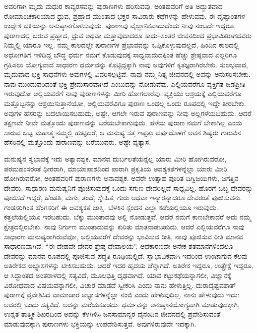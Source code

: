 ಅವರಿಗಾಗಿ ಮೃದು ಮಧುರ ಕಾವ್ಯರಸವನ್ನು ಪುರಾಣಗಳು ಹರಿಸುವವು. ಅಂತಹವರಿಗೆ ಅತಿ ಅದ್ಭುತವಾದ ರೋಮಾಂಚಕಾರಿಯಾದ ಧ್ರುವ, ಪ್ರಹ್ಲಾದ ಮುಂತಾದ ಭಕ್ತರ ಸಾವಿರಾರು ಕಥೆಗಳನ್ನು ಹೇಳುವವು. ಈ ದೃಷ್ಟಾಂತಗಳ ಉದ್ದೇಶ ಭಕ್ತಿಯನ್ನು ಅನುಷ್ಠಾನಗೊಳಿಸುವುದು. ಪುರಾಣವು ವೈಜ್ಞಾನಿಕವಾದುದೆಂದು ನೀವು ನಂಬದೇ ಇದ್ದರೂ, ಪುರಾಣದಲ್ಲಿ ಬರುವ ಪ್ರಹ್ಲಾದ, ಧ್ರುವ ಅಥವಾ ಮತ್ತಾವುದಾದರೂ ಸಾಧು–ಸಂತರ ಜೀವನದಿಂದ ಪ್ರಭಾವಿತರಾಗದವರು ನಿಮ್ಮಲ್ಲಿ ಯಾರೂ ಇಲ್ಲ. ನಮ್ಮ ಕಾಲದಲ್ಲೇ ಪುರಾಣಗಳ ಪ್ರಭಾವವನ್ನು ಒಪ್ಪಿಕೊಳ್ಳುವುದಲ್ಲದೆ, ಹಿಂದಿನ ಕಾಲದಲ್ಲಿ ಅಧೋಗತಿಗೆ ಇಳಿದಿದ್ದ ಬೌದ್ಧ ಧರ್ಮ ನಮಗೆ ಕೊಡುವುದಕ್ಕೆ ಸಾಧ್ಯವಾದುದಕ್ಕಿಂತ ಹೆಚ್ಚು ಶ್ರೇಷ್ಠವಾದ ಎಲ್ಲರಿಗೂ ಗ್ರಹಿಸಲು ಯೋಗ್ಯವಾದ ಸಾಧಾರಣ ಧರ್ಮವನ್ನು ಕೊಟ್ಟಿದ್ದಕ್ಕಾಗಿ ನಾವು ಅವುಗಳಿಗೆ ಕೃತಜ್ಞರಾಗಿರಬೇಕು. ಸುಲಭವಾದ, ಮೃದುವಾದ ಭಕ್ತಿ ಸಾಧನೆಗಳು ಅವುಗಳಲ್ಲಿ ವಿವರಿಸಲ್ಪಟ್ಟಿವೆ. ನಾವು ನಮ್ಮ ನಿತ್ಯ ಜೀವನದಲ್ಲಿ ಅವನ್ನು ಅನುಸರಿಸಬೇಕು. ನಾವು ಮುಂದುವರಿದಂತೆ ಭಕ್ತಿ ಪ್ರೇಮಸಾರವಾಗಿದೆ ಎಂಬುದನ್ನು ನೋಡುವೆವು. ಎಲ್ಲಿಯವರೆಗೂ ವ್ಯಕ್ತಿಗತ ಜಡಪ್ರೀತಿ ಇರುವುದೋ ಅಲ್ಲಿಯವರೆಗೆ ನಾವು ಪುರಾಣಗಳನ್ನು ಮೀರಿ ಹೋಗಲಾರೆವು. ವ್ಯಕ್ತಿಯು ಆಶ್ರಯಕ್ಕೆ ಎಲ್ಲಿಯವರೆಗೂ ಮತ್ತೊಬ್ಬನನ್ನು ಆಶ್ರಯಿಸುತ್ತಾನೆಯೋ, ಅಲ್ಲಿಯವರೆವಿಗೂ ಪುರಾಣ ಒಂದಲ್ಲ ಒಂದು ರೂಪದಲ್ಲಿ ಇದ್ದೇ ತೀರಬೇಕು. ಅವುಗಳ ಹೆಸರನ್ನು ಬದಲಾಯಿಸಬಹುದು, ಅಷ್ಟೇ, ಆಗಲೇ ಇರುವ ಪುರಾಣವನ್ನು ನೀವು ಅಲ್ಲಗಳೆಯಬಹುದು. ಆದರೆ ತಕ್ಷಣವೇ ನೀವೇ ಮತ್ತೊಂದು ಪುರಾಣವನ್ನು ಬರೆಯಬೇಕಾಗುವುದು. ಹಳೆಯ ಪುರಾಣ ನಮಗೆ ಬೇಕಾಗಿಲ್ಲ ಎಂದು ಸಾರುವ ಒಬ್ಬ ಮಹಾತ್ಮ ನಮ್ಮಲ್ಲಿ ಹುಟ್ಟಿದರೆ, ಆ ಮನುಷ್ಯ ಸತ್ತ ಇಪ್ಪತ್ತು ವರ್ಷದೊಳಗೆ ಅವನ ಶಿಷ್ಯರು ಗುರುವಿನ ಹೆಸರಿನಲ್ಲಿ ಮತ್ತೊಂದು ಪುರಾಣವನ್ನು ಬರೆಯುವರು. ಅಷ್ಟೇ ವ್ಯತ್ಯಾಸ.

ಮನುಷ್ಯನ ಸ್ವಭಾವಕ್ಕೆ ಇದು ಅತ್ಯಾವಶ್ಯಕ. ಮಾನವ ದುರ್ಬಲತೆಯನ್ನೆಲ್ಲ ಯಾರು ಮೀರಿ ಹೋಗಿರುವರೋ, ಪರಮಹಂಸರಂತೆ ಧೀರರಾಗಿ, ಮಾಯಾಪಾಶದಿಂದ ಪಾರಾಗಿ ಪ್ರಕೃತಿಯ ಅವಶ್ಯಕತೆಗಳನ್ನೆಲ್ಲಾ ಯಾರು ಮೀರಿ ಹೋಗಿರುವರೋ, ಅಂತಹವರಿಗೆ ಪುರಾಣಗಳು ಅನಾವಶ್ಯಕ. ಅವರೇ ಉತ್ಸಾಹ ಪೂರಿತ ದಿಗ್ವಿಜಯಿಗಳು, ಜಗತ್ತಿನ ದೇವರು. ಸಾಧಾರಣ ಮನುಷ್ಯನಿಗೆ ಪೂಜಿಸುವುದಕ್ಕೆ ಒಂದು ಸಗುಣ ದೇವರಿಲ್ಲದೆ ಸಾಧ್ಯವಿಲ್ಲ. ಹೊರಗೆ ಒಬ್ಬ ದೇವರನ್ನು ಪೂಜಿಸದೆ ಇದ್ದರೆ, ಹೆಂಡತಿ, ಮಗು, ತಂದೆ, ಸ್ನೇಹಿತ, ಗುರು ಅಥವಾ ಇನ್ನಾರನ್ನಾದರೂ ದೇವರಂತೆ ಪೂಜಿಸುವನು. ಗಂಡಸರಿಗಿಂತ ಹೆಂಗಸರಿಗೆ ಈ ಅವಶ್ಯಕತೆ ಜಾಸ್ತಿ. ಬೆಳಕಿನ ಸ್ಪಂದನ ಎಲ್ಲಾ ಕಡೆಯಲ್ಲಿಯೂ ಇರುವುದು. ಕತ್ತಲೆಯಲ್ಲಿಯೂ ಇರಬಹುದು. ಬೆಕ್ಕು ಮುಂತಾದವು ಅಲ್ಲಿ ನೋಡುತ್ತವೆ. ಆದರೆ ನಮಗೆ ಕಾಣಬೇಕಾದರೆ ಅದು ನಮ್ಮ ಕ್ಷೇತ್ರದಲ್ಲಿರಬೇಕು. ನಾವು ನಿರ್ಗುಣ ಮುಂತಾದುವನ್ನು ಕುರಿತು ಮಾತನಾಡಬಹುದು. ಆದರೆ ಎಲ್ಲಿಯವರೆಗೂ ನಾವು ಸಾಧಾರಣ ಮನುಷ್ಯರಾಗಿರುವೆವೋ, ಅಲ್ಲಿಯವರೆಗೆ ದೇವರನ್ನು ಭಾವಿಸುವ ರೀತಿ, ನಾವು ಪೂಜಿಸುವ ರೀತಿ ಮಾನವ ಸಾಧಾರಣವಾಗಿವೆ. “ಈ ದೇಹವೇ ದೇವರ ಶ್ರೇಷ್ಠ ದೇವಾಲಯ”. ಆದಕಾರಣವೇ ಅನೇಕ ಶತಮಾನಗಳಿಂದಲೂ ದೇವರನ್ನು ಮಾನವ ರೂಪದಲ್ಲಿ ಪೂಜಿಸುವ ಪದ್ಧತಿ ರೂಢಿಯಲ್ಲಿದೆ. ಸ್ವಾಭಾವಿಕವಾಗಿ ಇದರಿಂದ ಉಂಟಾಗುವ ಕೆಲವು ಅತಿರೇಕದ ಅಭ್ಯಾಸಗಳನ್ನು ಟೀಕಿಸಬಹುದು. ಆದರೆ ಇದರ ಹೃದಯ ಚೆನ್ನಾಗಿದೆ. ಅತಿರೇಕ ಇದ್ದರೂ, ಉತ್ಪ್ರೇಕ್ಷೆ ಇದ್ದರೂ, ಆ ಸಿದ್ಧಾಂತದ ಅಂತರಾಳದಲ್ಲಿ ಸತ್ಯವಿದೆ, ಮೂಲಭಿತ್ತಿ ದೃಢವಾಗಿದೆ. ಯಾವ ಕಟ್ಟುಕಥೆಯನ್ನಾಗಲೀ, ವಿಜ್ಞಾನಕ್ಕೆ ವಿರೋಧವಾದ ವಿಷಯವನ್ನಾಗಲೀ, ವಿಚಾರ ಮಾಡದೆ ಸ್ವೀಕರಿಸಿ ಎಂದು ನಾನು ಹೇಳುತ್ತಿಲ್ಲ. ದುರಾದೃಷ್ಟವಶಾತ್​ ಪುರಾಣಕ್ಕೆ ಪ್ರವೇಶಿಸಿದ ವಾಮಾಚಾರ ಅಭ್ಯಾಸಗಳನ್ನೆಲ್ಲಾ ನಂಬಿ ಎಂದು ಹೇಳುವುದಿಲ್ಲ. ನಾನು ಹೇಳುವುದು ಇದು: ಅದರಲ್ಲಿ ಒಂದು ಸತ್ಯವಿದೆ. ಅದನ್ನು ಮರೆಯಕೂಡದು. ಧರ್ಮವನ್ನು ಅನುಷ್ಠಾನಯೋಗ್ಯವಾಗಿ ಮಾಡುವುದಕ್ಕಾಗಿ, ಉನ್ನತ ತಾತ್ತ್ವಿಕ ಶಿಖರದಿಂದ ಅದನ್ನು ಕೆಳಗಿಳಿಸಿ ಜನಸಾಮಾನ್ಯರ ದೈನಂದಿನ ಜೀವನದಲ್ಲಿ ಪ್ರವೇಶಿಸುವಂತೆ ಮಾಡುವುದಕ್ಕಾಗಿ ಪುರಾಣಗಳು ಭಕ್ತಿಯನ್ನು ಉಪದೇಶಿಸುತ್ತವೆ. ಅವುಗಳಿರುವುದೇ ಇದಕ್ಕಾಗಿ.

